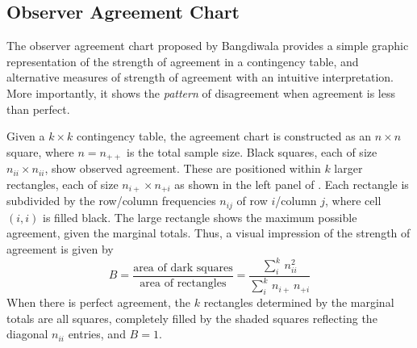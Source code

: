 \documentclass[10pt,krantz2]{krantz}\usepackage[]{graphicx}\usepackage[]{color}
\begin{document}
\subsection[Observer Agreement Chart]{Observer Agreement Chart}
\label{sec:twoway-Bangdiwala}
The observer agreement chart proposed by Bangdiwala
\citeyearpar{Bangdiwala:1985,Bangdiwala:87} provides a simple
graphic representation of the strength of agreement in a contingency
table, and alternative measures of strength of agreement with an intuitive
interpretation. More importantly, it shows the \emph{pattern} of disagreement
when agreement is less than perfect.

Given a $k \times k$ contingency table, the agreement chart is constructed as an \(n \times  n\) square,
where $n = n_{++}$ is the total sample size.  Black squares, each of size
\(n_{ii} \times  n_{ii}\), show observed agreement.  These are positioned
within $k$ larger rectangles, each of size \(n_{i+} \times  n_{+i}\)
as shown in the left panel of
.  
Each rectangle is subdivided by the row/column frequencies $n_{ij}$ of
row $i$/column $j$, where cell $(i, i)$ is filled black. The
large rectangle shows the maximum possible agreement, given the
marginal totals.  Thus, a visual impression of the strength of
agreement is given by
\begin{equation}\label{eq:bangb}
  B  =
  \frac{ \mbox{area of dark squares}}
  { \mbox{area of rectangles}}  =
  \frac{ \sum_i^k \,  n_{ii}^2 }
  { \sum_i^k \,  n_{i+} \,  n_{+i} }
\end{equation}
When there is perfect agreement, the $k$ rectangles determined by the
marginal totals are all squares, completely filled by the shaded squares
reflecting the diagonal $n_{ii}$ entries, and $B = 1$.
\end{document}
